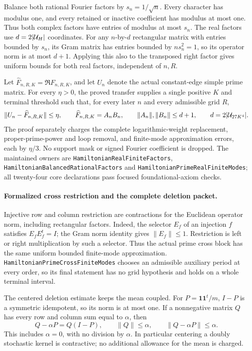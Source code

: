 Balance both rational Fourier factors by \(s_n=1/\sqrt n\).
Every character has modulus one, and every retained or inactive
coefficient has modulus at most one. Thus both complex factors
have entries of modulus at most \(s_n\).
The real factors use \(d=2|{\cal U}_H|\) coordinates.
For any \(n\)-by-\(d\) rectangular matrix with entries bounded
by \(s_n\), its Gram matrix has entries bounded by
\(ns_n^2=1\), so its operator norm is at most \(d+1\).
Applying this also to the transposed right factor gives
uniform bounds for both real factors, independent of \(n,R\).

Let \(\widehat F_{n,R,K}=\Re F_{n,R,K}\), and let \(U_n\)
denote the actual constant-edge simple prime matrix.
For every \(\eta>0\), the proved transfer supplies a single
positive \(K\) and terminal threshold such that, for every
later \(n\) and every admissible grid \(R\),
\[
 \|U_n-\widehat F_{n,R,K}\|\leq\eta,\qquad
 \widehat F_{n,R,K}=A_nB_n,\qquad
 \|A_n\|,\|B_n\|\leq d+1,\qquad d=2|{\cal U}_{27K^4}|.
\]
The proof separately charges the complete logarithmic-weight
replacement, proper-prime-power and loop removal, and
finite-mode approximation errors, each by \(\eta/3\).
No support mask or signed Fourier coefficient is dropped.
The maintained owners are
\texttt{HamiltonianRealFiniteFactors},
\texttt{HamiltonianBalancedRationalFactors} and
\texttt{HamiltonianPrimeRealFiniteModes}; all twenty-four
core declarations pass focused foundational-axiom checks.

\paragraph{Formalized cross restriction and the complete deletion packet.}
Injective row and column restriction are contractions for
the Euclidean operator norm, including rectangular factors.
Indeed, the selector \(E_f\) of an injection \(f\) satisfies
\(E_fE_f^t=I\); the Gram norm identity gives
\(\|E_f\|\leq1\). Restriction is left or right multiplication
by such a selector.
Thus the actual prime cross block has the same uniform
bounded finite-mode approximation.
\texttt{HamiltonianPrimeCrossFiniteModes} chooses an
admissible auxiliary period at every order, so its final
statement has no grid hypothesis and holds on a whole
terminal interval.

The centered deletion estimate keeps the mean coupled.
For \(P=\mathbf1\mathbf1^t/m\), \(I-P\) is a symmetric
idempotent, so its norm is at most one.
If a nonnegative matrix \(Q\) has every row and column
sum equal to \(\alpha\), then
\[
 Q-\alpha P=Q(I-P),\qquad
 \|Q\|\leq\alpha,\qquad
 \|Q-\alpha P\|\leq\alpha.                           \tag{31b}
\]
This includes \(\alpha=0\), with no division by \(\alpha\).
In particular centering a doubly stochastic kernel is
contractive; no additional allowance for the mean is charged.

